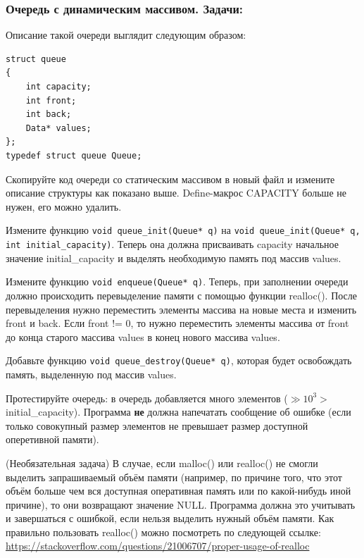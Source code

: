\documentclass{article}
\newenvironment{modenumerate}
  {\enumerate\setupmodenumerate}
  {\endenumerate}
\newif\ifmoditem
\newcommand{\setupmodenumerate}{%
  \global\moditemfalse
  \let\origmakelabel\makelabel
  \def\moditem##1{\global\moditemtrue\def\mesymbol{##1}\item}%
  \def\makelabel##1{%
    \origmakelabel{##1\ifmoditem\rlap{\mesymbol}\fi\enspace}%
    \global\moditemfalse}%
}
\begin{document}
\begin{modenumerate}
\subsubsection*{Очередь с динамическим массивом. Задачи:}

Описание такой очереди выглядит следующим образом:
\begin{verbatim}
struct queue
{
    int capacity;
    int front;
    int back;
    Data* values;
};
typedef struct queue Queue;
\end{verbatim}

\item Скопируйте код очереди со статическим массивом в новый файл и измените описание структуры как показано выше. Define-макрос CAPACITY больше не нужен, его можно удалить.

\item Измените функцию \texttt{void queue\_init(Queue* q)} на \texttt{void queue\_init(Queue* q, int initial\_capacity)}. Теперь она должна присваивать capacity начальное значение initial\_capacity и выделять необходимую память под массив values.

\item Измените функцию \texttt{void enqueue(Queue* q)}. Теперь, при заполнении очереди должно происходить перевыделение памяти с помощью функции realloc(). После перевыделения нужно переместить элементы массива на новые места и изменить front и back. Если front != 0, то нужно переместить элементы массива от front до конца старого массива values в конец нового массива values.

\item Добавьте функцию \texttt{void queue\_destroy(Queue* q)}, которая будет освобождать память, выделенную под массив values.

\item Протестируйте очередь: в очередь добавляется много элементов ($\gg 10^3 >$ initial\_capacity). Программа \textbf{не} должна напечатать сообщение об ошибке (если только совокупный размер элементов не превышает размер доступной оперетивной памяти). 

\moditem{*} (Необязательная задача) В случае, если malloc() или realloc() не смогли выделить запрашиваемый объём памяти (например, по причине того, что этот объём  больше чем вся доступная оперативная память или по какой-нибудь иной причине), то они возвращают значение NULL. Программа должна это учитывать и завершаться с ошибкой, если нельзя выделить нужный объём памяти.
Как правильно пользовать realloc() можно посмотреть по следующей ссылке:\\
\href{https://stackoverflow.com/questions/21006707/proper-usage-of-realloc}{https://stackoverflow.com/questions/21006707/proper-usage-of-realloc}
\end{modenumerate}
\end{document}
